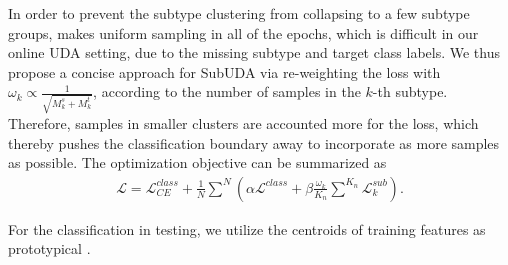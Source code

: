 In order to prevent the subtype clustering from collapsing to a few subtype groups, \cite{caron2018deep} makes uniform sampling in all of the epochs, which is difficult in our online UDA setting, due to the missing subtype and target class labels. We thus propose a concise approach for SubUDA via re-weighting the loss with $\omega_k\propto\frac{1}{\sqrt{M_k^s+M_k^t}}$, according to the number of samples in the $k$-{th} subtype. Therefore, samples in smaller clusters are accounted more for the loss, which thereby pushes the classification boundary away to incorporate as more samples as possible. The optimization objective can be summarized as \begin{equation}
\begin{aligned}
\mathcal{L}=\mathcal{L}_{CE}^{class}+\frac{1}{N}\sum^N(\alpha\mathcal{L}^{class}+\beta\frac{\omega_k}{K_n}\sum^{K_n}\mathcal{L}_k^{sub}).
\end{aligned}
\end{equation}
 
For the classification in testing, we utilize the centroids of training features as prototypical \cite{pan2019transferrable}.  
 

 
 
 
 
 
 
 
